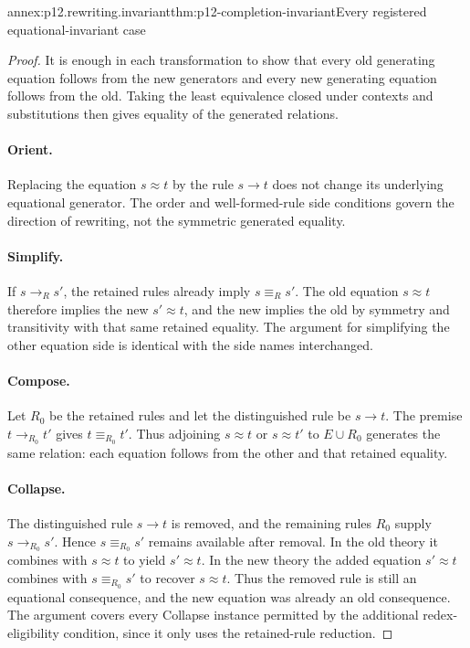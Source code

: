 \begin{annexitem}{annex:p12.rewriting.invariant}{thm:p12-completion-invariant}{Every registered equational-invariant case}
\begin{proof}
It is enough in each transformation to show that every old generating
equation follows from the new generators and every new generating
equation follows from the old. Taking the least equivalence closed
under contexts and substitutions then gives equality of the generated
relations.

\paragraph{Orient.}
Replacing the equation \(s\approx t\) by the rule \(s\to t\)
does not change its underlying equational generator. The order and
well-formed-rule side conditions govern the direction of rewriting,
not the symmetric generated equality.

\paragraph{Simplify.}
If \(s\to_R s'\), the retained rules already imply
\(s\equiv_R s'\). The old equation \(s\approx t\) therefore
implies the new \(s'\approx t\), and the new implies the old by
symmetry and transitivity with that same retained equality. The
argument for simplifying the other equation side is identical with
the side names interchanged.

\paragraph{Compose.}
Let \(R_0\) be the retained rules and let the distinguished rule be
\(s\to t\). The premise \(t\to_{R_0}t'\) gives
\(t\equiv_{R_0}t'\). Thus adjoining \(s\approx t\) or
\(s\approx t'\) to \(E\cup R_0\) generates the same relation:
each equation follows from the other and that retained equality.

\paragraph{Collapse.}
The distinguished rule \(s\to t\) is removed, and the remaining
rules \(R_0\) supply \(s\to_{R_0}s'\). Hence
\(s\equiv_{R_0}s'\) remains available after removal. In the old
theory it combines with \(s\approx t\) to yield \(s'\approx t\).
In the new theory the added equation \(s'\approx t\) combines
with \(s\equiv_{R_0}s'\) to recover \(s\approx t\).
Thus the removed rule is still an equational consequence, and the new
equation was already an old consequence. The argument covers every
Collapse instance permitted by the additional redex-eligibility
condition, since it only uses the retained-rule reduction.


\end{proof}
\end{annexitem}
